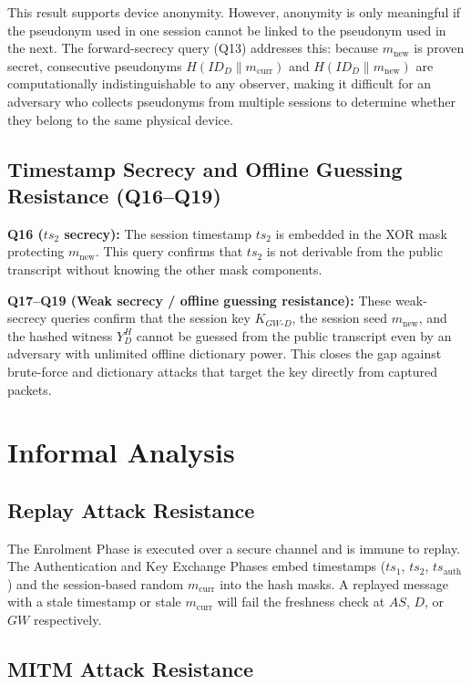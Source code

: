 \documentclass[12pt,a4paper]{report}
\begin{document}
This result supports device anonymity.
However, anonymity is only meaningful if the pseudonym used in one session cannot be
linked to the pseudonym used in the next.
The forward-secrecy query (Q13) addresses this: because $m_{\mathrm{new}}$ is proven
secret, consecutive pseudonyms $H(ID_D \| m_{\mathrm{curr}})$ and
$H(ID_D \| m_{\mathrm{new}})$ are computationally indistinguishable to any
observer, making it difficult for an adversary who collects pseudonyms from multiple
sessions to determine whether they belong to the same physical device.

\subsection{Timestamp Secrecy and Offline Guessing Resistance (Q16--Q19)}

\textbf{Q16 ($ts_2$ secrecy):}
The session timestamp $ts_2$ is embedded in the XOR mask protecting $m_{\mathrm{new}}$.
This query confirms that $ts_2$ is not derivable from the public transcript without
knowing the other mask components.

\textbf{Q17--Q19 (Weak secrecy / offline guessing resistance):}
These weak-secrecy queries confirm that the session key $K_{GW\text{-}D}$, the
session seed $m_{\mathrm{new}}$, and the hashed witness $Y_D^H$ cannot be guessed
from the public transcript even by an adversary with unlimited offline dictionary
power.
This closes the gap against brute-force and dictionary attacks that target the key
directly from captured packets.

\section{Informal Analysis}

\subsection{Replay Attack Resistance}

The Enrolment Phase is executed over a secure channel and is immune to replay.
The Authentication and Key Exchange Phases embed timestamps ($ts_1$, $ts_2$,
$ts_{\mathrm{auth}}$) and the session-based random $m_{\mathrm{curr}}$ into the hash
masks.
A replayed message with a stale timestamp or stale $m_{\mathrm{curr}}$ will fail the
freshness check at $AS$, $D$, or $GW$ respectively.

\subsection{MITM Attack Resistance}
\end{document}
